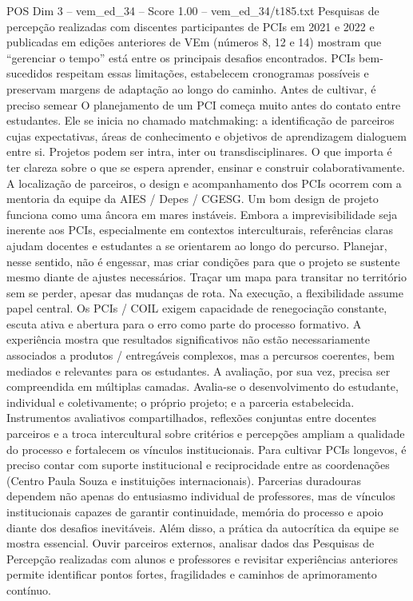 \begin{textsample}{POS Dim 3 – vem\_ed\_34 – Score 1.00 – vem\_ed\_34/t185.txt}
Pesquisas de percepção realizadas com discentes participantes de PCIs em 2021 e 2022 e publicadas em edições anteriores de VEm (números 8, 12 e 14) mostram que “gerenciar o tempo” está entre os principais desafios encontrados.
PCIs bem-sucedidos respeitam essas limitações, estabelecem cronogramas possíveis e preservam margens de adaptação ao longo do caminho.
Antes de cultivar, é preciso semear O planejamento de um PCI começa muito antes do contato entre estudantes.
Ele se inicia no chamado matchmaking: a identificação de parceiros cujas expectativas, áreas de conhecimento e objetivos de aprendizagem dialoguem entre si.
Projetos podem ser intra, inter ou transdisciplinares.
O que importa é ter clareza sobre o que se espera aprender, ensinar e construir colaborativamente.
A localização de parceiros, o design e acompanhamento dos PCIs ocorrem com a mentoria da equipe da AIES / Depes / CGESG.
Um bom design de projeto funciona como uma âncora em mares instáveis.
Embora a imprevisibilidade seja inerente aos PCIs, especialmente em contextos interculturais, referências claras ajudam docentes e estudantes a se orientarem ao longo do percurso.
Planejar, nesse sentido, não é engessar, mas criar condições para que o projeto se sustente mesmo diante de ajustes necessários.
Traçar um mapa para transitar no território sem se perder, apesar das mudanças de rota.
Na execução, a flexibilidade assume papel central.
Os PCIs / COIL exigem capacidade de renegociação constante, escuta ativa e abertura para o erro como parte do processo formativo.
A experiência mostra que resultados significativos não estão necessariamente associados a produtos / entregáveis complexos, mas a percursos coerentes, bem mediados e relevantes para os estudantes.
A avaliação, por sua vez, precisa ser compreendida em múltiplas camadas.
Avalia-se o desenvolvimento do estudante, individual e coletivamente; o próprio projeto; e a parceria estabelecida.
Instrumentos avaliativos compartilhados, reflexões conjuntas entre docentes parceiros e a troca intercultural sobre critérios e percepções ampliam a qualidade do processo e fortalecem os vínculos institucionais.
Para cultivar PCIs longevos, é preciso contar com suporte institucional e reciprocidade entre as coordenações (Centro Paula Souza e instituições internacionais).
Parcerias duradouras dependem não apenas do entusiasmo individual de professores, mas de vínculos institucionais capazes de garantir continuidade, memória do processo e apoio diante dos desafios inevitáveis.
Além disso, a prática da autocrítica da equipe se mostra essencial.
Ouvir parceiros externos, analisar dados das Pesquisas de Percepção realizadas com alunos e professores e revisitar experiências anteriores permite identificar pontos fortes, fragilidades e caminhos de aprimoramento contínuo.

\end{textsample}
